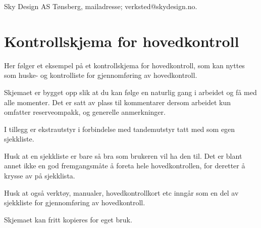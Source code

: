 Sky Design AS Tønsberg, mailadresse; verksted@skydesign.no.

\section{Kontrollskjema for hovedkontroll}
Her følger et eksempel på et kontrollskjema for hovedkontroll, som kan nyttes som huske- og kontrolliste for gjennomføring av hovedkontroll.

Skjemaet er bygget opp slik at du kan følge en naturlig gang i arbeidet og få med alle momenter. Det er satt av plass til kommentarer dersom arbeidet kun omfatter reserveompakk, og generelle anmerkninger.

I tillegg er ekstrautstyr i forbindelse med tandemutstyr tatt med som egen sjekkliste.

Husk at en sjekkliste er bare så bra som brukeren vil ha den til. Det er blant annet ikke en god fremgangsmåte å foreta hele hovedkontrollen, for deretter å krysse av på sjekklista.

Husk at også verktøy, manualer, hovedkontrollkort etc inngår som en del av sjekkliste for gjennomføring av hovedkontroll.

Skjemaet kan fritt kopieres for eget bruk.
